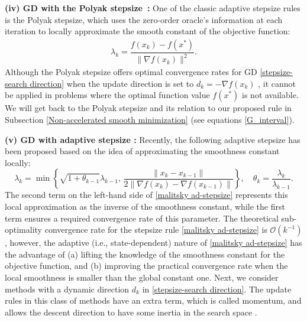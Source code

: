 \documentclass[11pt, a4paper, oneside, reqno]{amsart}
\begin{document}
\textbf{(iv) GD with the Polyak stepsize~\cite{poliak1987introduction}:} One of the classic adaptive stepsize rules is the Polyak stepsize, which uses the zero-order oracle's information at each iteration to locally approximate the smooth constant of the objective function:
    \begin{align}\label{Polyak stepsize}
        \lambda_k = \dfrac{f(x_k) - f(x^*)}{\| \nabla f(x_k)\|^2}.
    \end{align}
Although the Polyak stepsize offers optimal convergence rates for GD \eqref{stepsize-search direction} when the update direction is set to $d_k = -\nabla f(x_k)$ \cite{hazan2019revisiting}, it cannot be applied in problems where the optimal function value $f(x^*)$ is not available. We will get back to the Polyak stepsize and its relation to our proposed rule in Subsection \ref{Non-accelerated smooth minimization} (see equations \eqref{G_interval}).
    
\textbf{(v) GD with adaptive stepsize \cite{Malitsky2020}:} Recently, the following adaptive stepsize has been proposed based on the idea of approximating the smoothness constant locally: 
        \begin{equation} \label{malitsky ad-stepsize}
            \lambda_k = \min \left \{\sqrt{1+\theta_{k-1}}\lambda_{k-1}, \, \dfrac{\|x_k - x_{k-1}\|}{2\|\nabla f(x_k) - \nabla f(x_{k-1})\|}\right \},\quad\theta_k = \dfrac{\lambda_k}{\lambda_{k-1}}.
        \end{equation}
The second term on the left-hand side of \eqref{malitsky ad-stepsize} represents this local approximation as the inverse of the smoothness constant, while the first term ensures a required convergence rate of this parameter. The theoretical sub-optimality convergence rate for the stepsize rule \eqref{malitsky ad-stepsize} is $\mathcal{O}(k^{-1})$, however, the adaptive (i.e., state-dependent) nature of \eqref{malitsky ad-stepsize} has the advantage of (a) lifting the knowledge of the smoothness constant for the objective function, and (b) improving the practical convergence rate when the local smoothness is smaller than the global constant one.
Next, we consider methods with a dynamic direction $d_k$ in \eqref{stepsize-search direction}. The update rules in this class of methods have an extra term, which is called momentum, and allows the descent direction to have some inertia in the search space \cite{Polyak1969}. 
\end{document}
